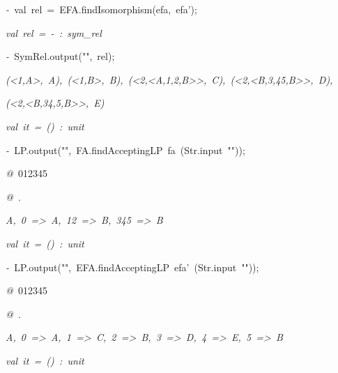 \begin{list}{}
\item[]\textsl{-\ }val\ rel\ =\ EFA.findIsomorphism(efa,\ efa');
\item[]\textsl{val\ rel\ =\ -\ :\ sym_rel}
\item[]\textsl{-\ }SymRel.output("",\ rel);
\item[]\textsl{(<1,A>,\ A),\ (<1,B>,\ B),\ (<2,<A,1,2,B>>,\ C),\ (<2,<B,3,45,B>>,\ D),}
\item[]\textsl{(<2,<B,34,5,B>>,\ E)}
\item[]\textsl{val\ it\ =\ ()\ :\ unit}
\item[]\textsl{-\ }LP.output("",\ FA.findAcceptingLP\ fa\ (Str.input\ ""));
\item[]\textsl{@\ }012345
\item[]\textsl{@\ }.
\item[]\textsl{A,\ 0\ =>\ A,\ 12\ =>\ B,\ 345\ =>\ B}
\item[]\textsl{val\ it\ =\ ()\ :\ unit}
\item[]\textsl{-\ }LP.output("",\ EFA.findAcceptingLP\ efa'\ (Str.input\ ""));
\item[]\textsl{@\ }012345
\item[]\textsl{@\ }.
\item[]\textsl{A,\ 0\ =>\ A,\ 1\ =>\ C,\ 2\ =>\ B,\ 3\ =>\ D,\ 4\ =>\ E,\ 5\ =>\ B}
\item[]\textsl{val\ it\ =\ ()\ :\ unit}
\end{list}
